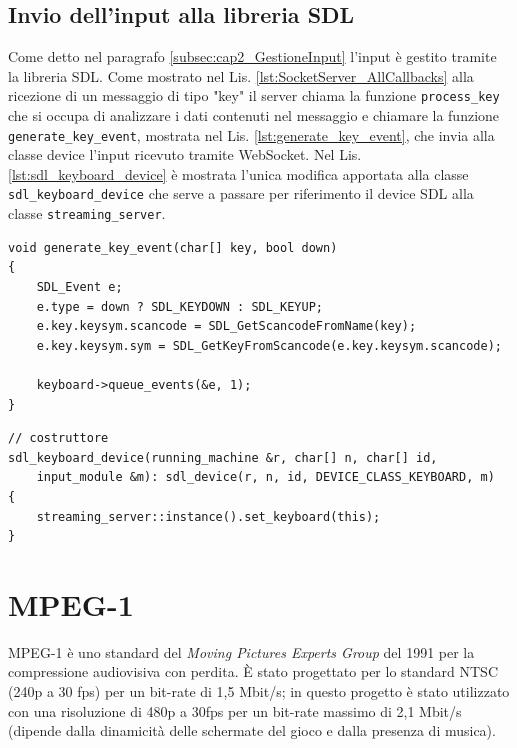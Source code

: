 \subsection{Invio dell'input alla libreria SDL}
Come detto nel paragrafo \ref{subsec:cap2_GestioneInput} l'input è gestito tramite la libreria SDL. Come mostrato nel Lis. \ref{lst:SocketServer_AllCallbacks} alla ricezione di un messaggio di tipo "key" il server chiama la funzione \verb|process_key| che si occupa di analizzare i dati contenuti nel messaggio e chiamare la funzione \verb|generate_key_event|, mostrata nel Lis. \ref{lst:generate_key_event}, che invia alla classe device l'input ricevuto tramite WebSocket. Nel Lis. \ref{lst:sdl_keyboard_device} è mostrata l'unica modifica apportata alla classe \verb|sdl_keyboard_device| che serve a passare per riferimento il device SDL alla classe \verb|streaming_server|.

\begin{lstlisting}[caption=Codice relativo alla gestione input lato server: modulo server. File: \detokenize{lib/util/streaming_server.hpp}, label={lst:generate_key_event}]
void generate_key_event(char[] key, bool down)
{
	SDL_Event e;
	e.type = down ? SDL_KEYDOWN : SDL_KEYUP;
	e.key.keysym.scancode = SDL_GetScancodeFromName(key);
	e.key.keysym.sym = SDL_GetKeyFromScancode(e.key.keysym.scancode);

	keyboard->queue_events(&e, 1);
}
\end{lstlisting}

\begin{lstlisting}[caption=Codice relativo alla gestione input lato server: modulo SDL. File: \detokenize{osd/modules/input/input_sdl.cpp}, label={lst:sdl_keyboard_device}]
// costruttore
sdl_keyboard_device(running_machine &r, char[] n, char[] id,
	input_module &m): sdl_device(r, n, id, DEVICE_CLASS_KEYBOARD, m)
{
	streaming_server::instance().set_keyboard(this);
}
\end{lstlisting}




\section{MPEG-1} \label{sec:cap3_MPEG}
MPEG-1 è uno standard del \textit{Moving Pictures Experts Group} del 1991 per la compressione audiovisiva con perdita. È stato progettato per lo standard NTSC (240p a 30 fps) per un bit-rate di 1,5 Mbit/s; in questo progetto è stato utilizzato con una risoluzione di 480p a 30fps per un bit-rate massimo di 2,1 Mbit/s (dipende dalla dinamicità delle schermate del gioco e dalla presenza di musica).

